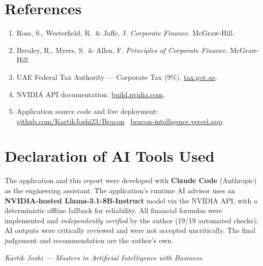 \documentclass[11pt,a4paper]{article}
\begin{document}
\section*{References}
\begin{enumerate}[leftmargin=1.6em,itemsep=1pt]
\item Ross, S., Westerfield, R.\ \& Jaffe, J. \emph{Corporate Finance}. McGraw-Hill.
\item Brealey, R., Myers, S.\ \& Allen, F. \emph{Principles of Corporate Finance}. McGraw-Hill.
\item UAE Federal Tax Authority --- Corporate Tax (9\%). \href{https://tax.gov.ae}{tax.gov.ae}.
\item NVIDIA API documentation. \href{https://build.nvidia.com}{build.nvidia.com}.
\item Application source code and live deployment: \href{https://github.com/KartikJoshi23/Beacon}{github.com/KartikJoshi23/Beacon} \textbullet\ \href{https://beacon-intelligence.vercel.app/}{beacon-intelligence.vercel.app}.
\end{enumerate}

\section*{Declaration of AI Tools Used}
The application and this report were developed with \textbf{Claude Code} (Anthropic) as the engineering assistant. The application's runtime AI advisor uses an \textbf{NVIDIA-hosted Llama-3.1-8B-Instruct} model via the NVIDIA API, with a deterministic offline fallback for reliability. All financial formulas were implemented and \emph{independently verified} by the author (19/19 automated checks); AI outputs were critically reviewed and were not accepted uncritically. The final judgement and recommendation are the author's own.

\vfill
\begin{center}\small\itshape Kartik Joshi --- Masters in Artificial Intelligence with Business.\end{center}
\end{document}
